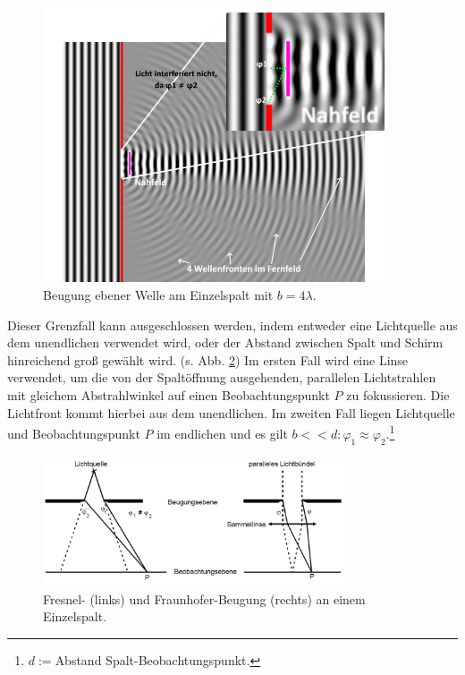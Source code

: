 \begin{figure}
    \centering
    \includegraphics[width=0.9\textwidth]{plots/Wave_Diffraction_4Lambda_Slit.png}
    \caption{Beugung ebener Welle am Einzelspalt mit $b = 4\lambda$.\protect\footnotemark}        %
    \label{fig:waveDiff}
\end{figure}

Dieser Grenzfall kann ausgeschlossen werden, indem entweder eine Lichtquelle aus dem unendlichen verwendet wird, oder der Abstand zwischen Spalt und Schirm hinreichend groß gewählt wird. (s. Abb. \ref{fig:fresnelFraunhofer})
Im ersten Fall wird eine Linse verwendet, um die von der Spaltöffnung ausgehenden, parallelen Lichtstrahlen mit gleichem Abstrahlwinkel auf einen Beobachtungspunkt $P$ zu fokussieren. Die Lichtfront kommt hierbei aus dem unendlichen.
Im zweiten Fall liegen Lichtquelle und Beobachtungspunkt $P$ im endlichen und es gilt $b << d : \varphi_1 \approx \varphi_2$.\:\footnote{$d := $Abstand Spalt-Beobachtungspunkt.}

\begin{figure}
    \centering
    \includegraphics[width=0.8\textwidth]{plots/Fresnel_Fraunhofer.png}
    \caption{Fresnel- (links) und Fraunhofer-Beugung (rechts) an einem Einzelspalt.\protect\footnotemark}
    \label{fig:fresnelFraunhofer}
\end{figure}

